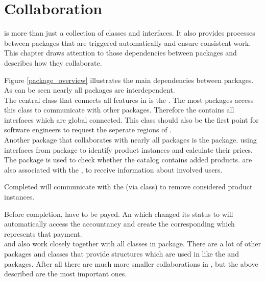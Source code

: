 \chapter{Collaboration}
\label{chap:collaboration}

\salespoint{} is more than just a collection of classes and interfaces. It also provides processes between packages that are triggered automatically and ensure consistent work. This chapter draws attention to those dependencies between packages and describes how they collaborate.  

Figure \ref{package_overview} illustrates the main dependencies between \salespoint{} packages. As can be seen nearly all packages are interdependent.\\ 

The central class that connects all features in \salespoint{} is the . The most packages access this class to communicate with other packages. Therefore the  contains all interfaces which are global connected. This class should also be the first point for software engineers to request the seperate regions of \salespoint{}.\\

Another package that collaborates with nearly all packages is the  package.  using interfaces from  package to identify product instances and calculate their prices. The  package is used to check whether the catalog contains added products.  are also associated with the , to receive information about involved users.\par 
Completed  will communicate with the  (via  class) to remove considered product instances. \par
Before completion,  have to be payed. An  which changed its status to  will automatically access the accountancy and create the corresponding  which represents that payment.\\ 

 and  also work closely together with all classes in  package. There are a lot of other packages and classes that provide structures which are used in \salespoint{} like the  and  packages. After all there are much more smaller collaborations in \salespoint{}, but the above described are the most important ones.




